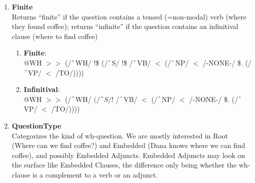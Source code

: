 \begin{enumerate}
    \item \textbf{Finite}\\
    Returns ``finite'' if the question contains a tensed (=non-modal) verb (\textsf{where they found coffee}); returns ``infinite'' if the question contains an infinitival clause (\textsf{where to find coffee})
        \begin{enumerate}
            \item \textbf{Finite}: \\
            @WH $>\!\!>$ (/$\string^$WH/ !\$ (/$\string^$S/ !\$ /$\string^$VB/ $<$ (/$\string^$NP/ $<$ /-NONE-/ \$. (/$\string^$VP/ $<$ /TO/))))
            \item \textbf{Infinitival}: \\
            @WH $>\!\!>$ (/$\string^$WH/ $ (/$\string^$S/ !$ /$\string^$VB/ $<$ (/$\string^$NP/ $<$ /-NONE-/ \$. (/$\string^$VP/ $<$ /TO/))))
        \end{enumerate}
    
    \item \textbf{QuestionType}\\
    Categorizes the kind of wh-question. We are mostly interested in Root (\textsf{Where can we find coffee?}) and Embedded (Dana knows where we can find coffee), and possibly Embedded Adjuncts. Embedded Adjuncts may look on the surface like Embedded Clauses, the difference only being whether the wh-clause is a complement to a verb or an adjunct. 


\end{enumerate}
